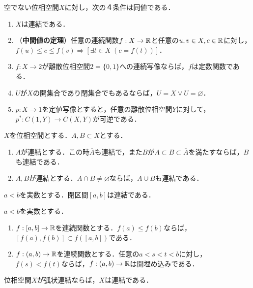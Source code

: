 \documentclass[uplatex,dvipdfmx]{jsreport}
\begin{document}
\begin{proposition}\label{prop-charactorization-of-connectedness}
    空でない位相空間$X$に対し，次の４条件は同値である．
    \begin{enumerate}
        \item $X$は連結である．
        \item （\textbf{中間値の定理}）任意の連続関数$f:X\to\mathbb{R}$と任意の$u,v\in X, c\in\mathbb{R}$に対し，$f(u)\le c\le f(v)\Rightarrow[\exists t\in X\;(c=f(t))]$．
        \item $f:X\to 2$が離散位相空間$2=\{0,1\}$への連続写像ならば，$f$は定数関数である．
        \item $U$が$X$の開集合であり閉集合でもあるならば，$U=X\lor U=\varnothing$．
        \item $p:X\to 1$を定値写像とすると，任意の離散位相空間$Y$に対して，$p^*:C(1,Y)\to C(X,Y)$が可逆である．
    \end{enumerate}
\end{proposition}

\begin{corollary}[連結性の伝播]
    $X$を位相空間とする．$A,B\subset X$とする．
    \begin{enumerate}
        \item $A$が連結とする．この時$\overline{A}$も連結で，また$B$が$A\subset B\subset\overline{A}$を満たすならば，$B$も連結である．
        \item $A,B$が連結とする．$A\cap B\ne\varnothing$ならば，$A\cup B$も連結である．
    \end{enumerate}
\end{corollary}

\begin{proposition}
    $a<b$を実数とする．閉区間$[a,b]$は連結である．
\end{proposition}

\begin{corollary}
    $a<b$を実数とする．
    \begin{enumerate}
        \item $f:[a,b]\to\mathbb{R}$を連続関数とする．$f(a)\le f(b)$ならば，$[f(a),f(b)]\subset f([a,b])$である．
        \item $f:(a,b)\to\mathbb{R}$を連続関数とする．任意の$a<s<t<b$に対し，$f(s)<f(t)$ならば，$f:(a,b)\to\mathbb{R}$は開埋め込みである．
    \end{enumerate}
\end{corollary}

\begin{corollary}
    位相空間$X$が弧状連結ならば，$X$は連結である．
\end{corollary}
\end{document}
